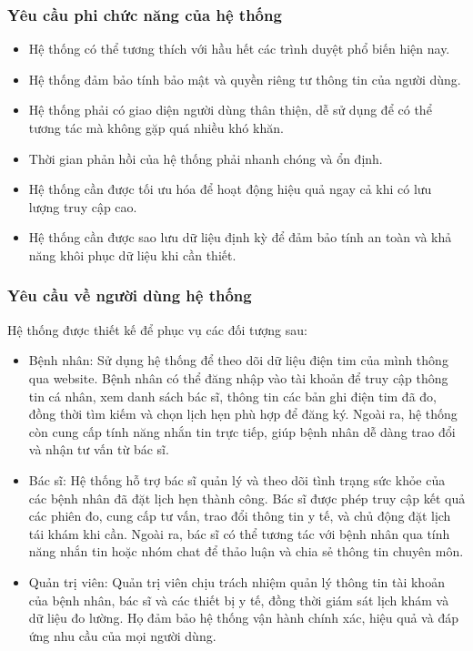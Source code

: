 \subsubsection{Yêu cầu phi chức năng của hệ thống}
\begin{itemize}
	\item Hệ thống có thể tương thích với hầu hết các trình duyệt phổ biến hiện nay.
	\item Hệ thống đảm bảo tính bảo mật và quyền riêng tư thông tin của người dùng.
	\item Hệ thống phải có giao diện người dùng thân thiện, dễ sử dụng để có thể tương tác mà không gặp quá nhiều khó khăn.
	\item Thời gian phản hồi của hệ thống phải nhanh chóng và ổn định.
	\item Hệ thống cần được tối ưu hóa để hoạt động hiệu quả ngay cả khi có lưu lượng truy cập cao.
	\item Hệ thống cần được sao lưu dữ liệu định kỳ để đảm bảo tính an toàn và khả năng khôi phục dữ liệu khi cần thiết.
\end{itemize}

\subsubsection{Yêu cầu về người dùng hệ thống}
Hệ thống được thiết kế để phục vụ các đối tượng sau:
\begin{adjustwidth}{1.5em}{}
	\begin{itemize}
		\item Bệnh nhân: Sử dụng hệ thống để theo dõi dữ liệu điện tim của mình thông qua website.
		      Bệnh nhân có thể đăng nhập vào tài khoản để truy cập thông tin cá nhân, xem danh sách bác sĩ, thông tin các bản ghi điện tim đã đo, đồng thời tìm kiếm và chọn lịch hẹn phù hợp để đăng ký.
		      Ngoài ra, hệ thống còn cung cấp tính năng nhắn tin trực tiếp, giúp bệnh nhân dễ dàng trao đổi và nhận tư vấn từ bác sĩ.

		\item Bác sĩ: Hệ thống hỗ trợ bác sĩ quản lý và theo dõi tình trạng sức khỏe của các bệnh nhân đã đặt lịch hẹn thành công.
		      Bác sĩ được phép truy cập kết quả các phiên đo, cung cấp tư vấn, trao đổi thông tin y tế, và chủ động đặt lịch tái khám khi cần.
		      Ngoài ra, bác sĩ có thể tương tác với bệnh nhân qua tính năng nhắn tin hoặc nhóm chat để thảo luận và chia sẻ thông tin chuyên môn.

		\item Quản trị viên: Quản trị viên chịu trách nhiệm quản lý thông tin tài khoản của bệnh nhân, bác sĩ và các thiết bị y tế, đồng thời giám sát lịch khám và dữ liệu đo lường.
		      Họ đảm bảo hệ thống vận hành chính xác, hiệu quả và đáp ứng nhu cầu của mọi người dùng.
	\end{itemize}
\end{adjustwidth}


